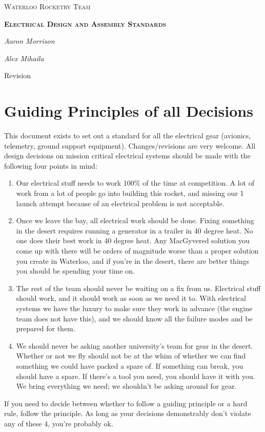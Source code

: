 \documentclass{article}
\date{\today}
\begin{document}
\begin{titlepage}
	\centering
	{\scshape\Huge Waterloo Rocketry Team \par}
	\vspace{1.5cm}
	{\scshape\bfseries\LARGE Electrical Design and Assembly Standards\par}
	\vspace{2cm}
	{\Large\itshape Aaron Morrison\par}
	{\Large\itshape Alex Mihaila\par}
	\vfill

	{\large \makeatletter\@date\par Revision \version}
    \par
\end{titlepage}

\section{Guiding Principles of all Decisions}
This document exists to set out a standard for all the electrical gear (avionics, telemetry, ground support equipment). Changes/revisions are very welcome. All design decisions on mission critical electrical systems should be made with the following four points in mind:

\begin{enumerate}
\item Our electrical stuff needs to work 100\% of the time at competition. A lot of work from a lot of people go into building this rocket, and missing our 1 launch attempt because of an electrical problem is not acceptable.
\item Once we leave the bay, all electrical work should be done. Fixing something in the desert requires running a generator in a trailer in 40 degree heat. No one does their best work in 40 degree heat. Any MacGyvered solution you come up with there will be orders of magnitude worse than a proper solution you create in Waterloo, and if you're in the desert, there are better things you should be spending your time on.
\item The rest of the team should never be waiting on a fix from us. Electrical stuff should work, and it should work as soon as we need it to. With electrical systems we have the luxury to make sure they work in advance (the engine team does not have this), and we should know all the failure modes and be prepared for them. 
\item We should never be asking another university's team for gear in the desert. Whether or not we fly should not be at the whim of whether we can find something we could have packed a spare of. If something can break, you should have a spare. If there's a tool you need, you should have it with you. We bring everything we need; we shouldn't be asking around for gear.
\end{enumerate}
If you need to decide between whether to follow a guiding principle or a hard rule, follow the principle. As long as your decisions demonstrably don't violate any of these 4, you're probably ok.
\end{document}
